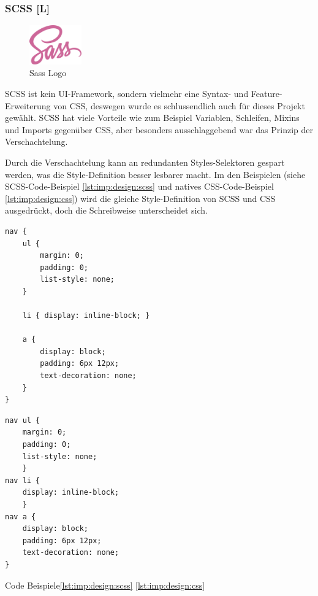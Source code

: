 \subsubsection{SCSS [L]}
\begin{figure}
  \begin{center}
    \includegraphics[width=0.2\textwidth]{pics/Sass_Logo.png}
   \caption{Sass Logo}
  \end{center}
\end{figure}
SCSS ist kein UI-Framework, sondern vielmehr eine Syntax- und Feature-Erweiterung von CSS, deswegen wurde es schlussendlich auch für dieses Projekt gewählt. SCSS hat viele Vorteile wie zum Beispiel Variablen, Schleifen, Mixins und Imports gegenüber CSS, aber besonders ausschlaggebend war das Prinzip der Verschachtelung. \cite[Sass Guide]{SassGuide}

Durch die Verschachtelung kann an redundanten Styles-Selektoren gespart werden, was die Style-Definition besser lesbarer macht. Im den Beispielen (siehe SCSS-Code-Beispiel \ref{lst:imp:design:scss} und natives CSS-Code-Beispiel \ref{lst:imp:design:css}) wird die gleiche Style-Definition von SCSS und CSS ausgedrückt, doch die Schreibweise unterscheidet sich. \cite[Sass Guide]{SassGuide}

\cite[Sass Guide]{SassGuide}


\begin{lstlisting}[caption=SCSS - Code Beispiel,label=lst:imp:design:scss]
nav {
    ul {
        margin: 0;
        padding: 0;
        list-style: none;
    }
    
    li { display: inline-block; }
    
    a {
        display: block;
        padding: 6px 12px;
        text-decoration: none;
    }
}
\end{lstlisting}

\begin{lstlisting}[caption=CSS - Code Beispiel,label=lst:imp:design:css]
nav ul {
    margin: 0;
    padding: 0;
    list-style: none;
    }
nav li {
    display: inline-block;
    }
nav a {
    display: block;
    padding: 6px 12px;
    text-decoration: none;
}
\end{lstlisting}

Code Beispiele\ref{lst:imp:design:scss} \ref{lst:imp:design:css} \cite[Sass Guide]{SassGuide}


